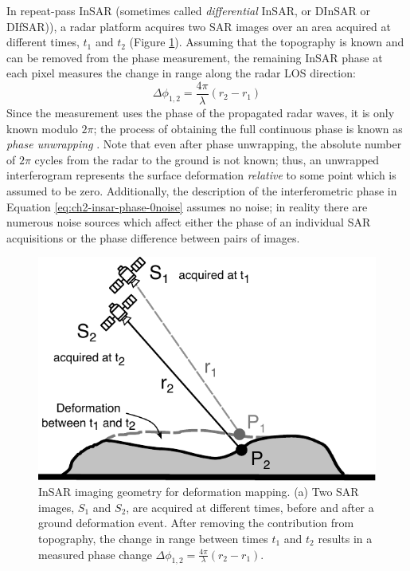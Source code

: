 In repeat-pass InSAR (sometimes called \emph{differential} InSAR, or DInSAR or DIfSAR)), a radar platform acquires two SAR images over an area acquired at different times, $t_1$ and $t_2$ (Figure \ref{fig:ch2-insar-geometry-defo}). Assuming that the topography is known and can be removed from the phase measurement, the remaining InSAR phase at each pixel measures the change in range along the radar LOS direction:
\begin{equation}
	\Delta \phi_{1,2} = \frac{4 \pi}{\lambda}(r_2 - r_1)   \label{eq:ch2-insar-phase-0noise}
\end{equation} 
Since the measurement uses the phase of the propagated radar waves, it is only known modulo $2\pi$; the process of obtaining the full continuous phase is known as \emph{phase unwrapping}
\citep{Goldstein1988SatelliteRadarInterferometry, Chen2001TwoDimensionalPhase}. Note that even after phase unwrapping, the absolute number of $2\pi$ cycles from the radar to the ground is not known; thus, an unwrapped interferogram represents the surface deformation \emph{relative} to some point which is assumed to be zero.
Additionally, the description of the interferometric phase in Equation \eqref{eq:ch2-insar-phase-0noise} assumes no noise; in reality there are numerous noise sources which affect either the phase of an individual SAR acquisitions or the phase difference between pairs of images.



\begin{figure}
	\centering
	\includegraphics[width=0.9\linewidth]{figures/chapter2-sar/insar-geometry-defo.pdf}
	\caption[InSAR imaging geometry for deformation mapping]{InSAR imaging geometry for deformation mapping.
		(a) Two SAR images, $S_1$ and $S_2$, are acquired at different times, before and after a ground deformation event. After removing the contribution from topography, the change in range between times $t_1$ and $t_2$ results in a measured phase change $\Delta \phi_{1,2} =  \frac{4 \pi}{\lambda}(r_2 - r_1)$.
	}
	\label{fig:ch2-insar-geometry-defo}
\end{figure}

